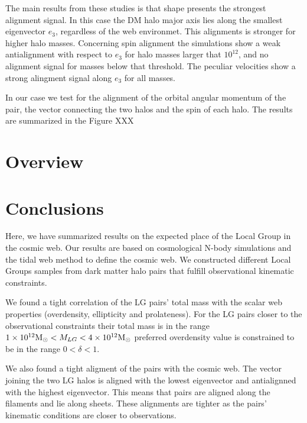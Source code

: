 \documentclass{iau}
\newcommand{\Msun}{{\ifmmode{{\rm {M_{\odot}}}}\else{${\rm{M_{\odot}}}$}\fi}}
\begin{document}
The main results from these studies is that shape presents the
strongest alignment signal. In this case the DM halo major axis lies
along the smallest eigenvector $e_{3}$, regardless of the web
environmet. This alignments is stronger for higher halo
masses. Concerning spin alignment the simulations show a weak
antialignment with respect to $e_{3}$ for halo masses larger that
$10^{12}$\Msun, and no alignment signal for masses below that
threshold. The peculiar velocities show a strong alingment signal
along $e_{3}$ for all masses.


In our case we test for the alignment of the orbital angular momentum
of the pair, the vector connecting the two halos and the spin of each
halo. The results are summarized in the Figure XXX


\section{Overview}







\section{Conclusions}

Here, we have summarized results on the expected place of the Local
Group in the cosmic web. Our results are based on cosmological N-body
simulations and the tidal web method to define the cosmic web. We
constructed different Local Groups samples from dark matter halo pairs
that fulfill observational kinematic constraints. 

We found a tight correlation of the LG pairs' total mass with the scalar
web properties (overdensity, ellipticity and prolateness). For the LG
pairs closer to the observational constraints their total mass is in
the range $1\times 10^{12}\Msun < M_{LG} < 4\times 10^{12}\Msun$
preferred overdensity value is constrained to be in the range
$0<\delta <1$. 

We also found a tight aligment of the pairs with the cosmic web. The
vector joining the two LG halos is aligned with the lowest eigenvector
and antialignned with the highest eigenvector. This means that pairs
are aligned along the filaments and lie along sheets. These alignments
are tighter as the pairs' kinematic conditions are closer to
observations.


 
\end{document}
